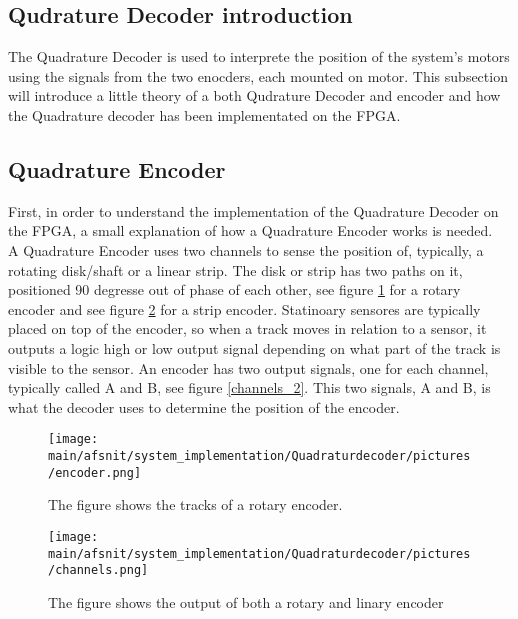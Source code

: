 \documentclass[../../../main]{subfiles}
\begin{document}
\subsection*{Qudrature Decoder introduction}
The Quadrature Decoder is used to interprete the position of the system's motors using the signals from the two enocders, each  mounted on motor. This subsection will introduce a little theory of a both Qudrature Decoder and encoder and how the Quadrature decoder has been implementated on the FPGA.
\subsection*{Quadrature Encoder}
\label{sub:Theory}

First, in order to understand the implementation of the Quadrature Decoder on the FPGA, a small explanation of how a Quadrature Encoder works is needed. \\
A Quadrature Encoder uses two channels to sense the position of, typically, a rotating disk/shaft or a linear strip. The disk or strip has two paths on it, positioned 90 degresse out of phase of each other, see figure \ref{rotary_encoder} for a rotary encoder and see figure \ref{channels_1} for a strip encoder. Statinoary sensores are typically placed on top of the encoder, so when a track moves in relation to a sensor, it outputs a logic high or low output signal depending on what part of the track is visible to the sensor. An encoder has two output signals, one for each channel, typically called A and B, see figure \ref{channels_2}. This two signals, A and B, is what the decoder uses to determine the position of the encoder.


\begin{figure}[H]
  \texttt{[image: \\main/afsnit/system\_implementation/Quadraturdecoder/pictures/encoder.png]}
  \caption{The figure shows the tracks of a rotary encoder.}
  \label{rotary_encoder}
\end{figure}

\begin{figure}[H]
  \texttt{[image: \\main/afsnit/system\_implementation/Quadraturdecoder/pictures/channels.png]}
  \caption{The figure shows the output of both a rotary and linary encoder}
  \label{channels_1}
\end{figure}
\end{document}
